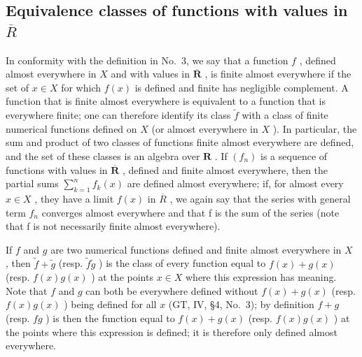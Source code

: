 \subsection{\texorpdfstring{Equivalence classes of functions with values in \(\overline{R}\)}{Equivalence classes of functions with values in R-bar}}

In conformity with the definition in No.~3, we say that a function \(f\) , defined almost everywhere in \(X\) and with values in \(\overline{\mathbf{R}}\) , is finite almost everywhere if the set of \(x \in X\) for which \(f(x)\) is defined and finite has negligible complement. A function that is finite almost everywhere is equivalent to a function that is everywhere finite; one can therefore identify its class \(\widetilde{f}\) with a class of finite numerical functions defined on \(X\) (or almost everywhere in \(X\) ). In particular, the sum and product of two classes of functions finite almost everywhere are defined, and the set of these classes is an algebra over \(\mathbf{R}\) . If \((f_n)\) is a sequence of functions with values in \(\overline{\mathbf{R}}\) , defined and finite almost everywhere, then the partial sums \(\sum_{k=1}^{n} f_k(x)\) are defined almost everywhere; if, for almost every \(x \in X\) , they have a limit \(f(x)\) in \(\overline{R}\) , we again say that the series with general term \(f_{n}\) converges almost everywhere and that f is the sum of the series (note that f is not necessarily finite almost everywhere).

If \(f\) and \(g\) are two numerical functions defined and finite almost everywhere in \(X\) , then \(\widetilde{f} + \widetilde{g}\) (resp. \(\widetilde{f}\widetilde{g}\) ) is the class of every function equal to \(f(x) + g(x)\) (resp. \(f(x)g(x)\) ) at the points \(x \in X\) where this expression has meaning. Note that \(f\) and \(g\) can both be everywhere defined without \(f(x) + g(x)\) (resp. \(f(x)g(x)\) ) being defined for all \(x\) (GT, IV, §4, No.~3); by definition \(f + g\) (resp. \(fg\) ) is then the function equal to \(f(x) + g(x)\) (resp. \(f(x)g(x)\) ) at the points where this expression is defined; it is therefore only defined almost everywhere.

